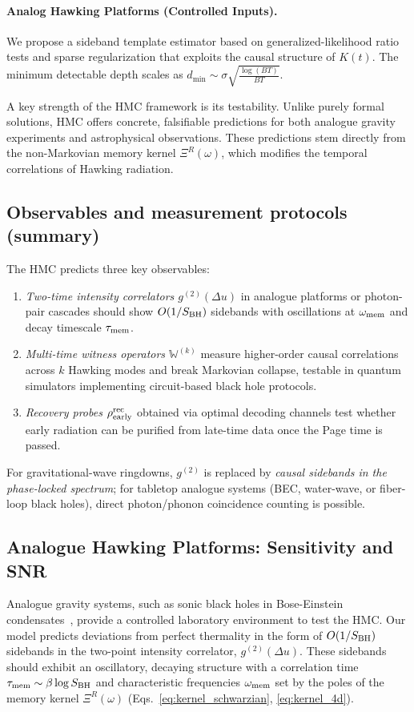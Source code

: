 \documentclass[a4paper,11pt]{article}
\newcommand{\HMC}{\textsc{HMC}\xspace}
\theoremstyle{plain}
\theoremstyle{definition}
\theoremstyle{remark}
\begin{document}
\paragraph{Analog Hawking Platforms (Controlled Inputs).}
We propose a sideband template estimator based on generalized-likelihood ratio tests and sparse regularization that exploits the causal structure of $K(t)$. The minimum detectable depth scales as $d_{\min}\sim \sigma \sqrt{\frac{\log(BT)}{BT}}$. 



A key strength of the \HMC{} framework is its testability. Unlike purely formal solutions, \HMC{} offers concrete, falsifiable predictions for both analogue gravity experiments and astrophysical observations. These predictions stem directly from the non-Markovian memory kernel $\Xi^R(\omega)$, which modifies the temporal correlations of Hawking radiation.

\subsection{Observables and measurement protocols (summary)}
The \HMC{} predicts three key observables:
\begin{enumerate}[label=(\roman*)]
\item \emph{Two-time intensity correlators $g^{(2)}(\Delta u)$} in analogue platforms or photon-pair cascades should show $O(1/S_{\rm BH})$ sidebands with oscillations at $\omega_{\rm mem}$ and decay timescale $\tau_{\rm mem}$.
\item \emph{Multi-time witness operators $\mathbb{W}^{(k)}$} measure higher-order causal correlations across $k$ Hawking modes and break Markovian collapse, testable in quantum simulators implementing circuit-based black hole protocols.
\item \emph{Recovery probes $\rho^{\rm rec}_{\rm early}$} obtained via optimal decoding channels test whether early radiation can be purified from late-time data once the Page time is passed.
\end{enumerate}
For gravitational-wave ringdowns, $g^{(2)}$ is replaced by \emph{causal sidebands in the phase-locked spectrum}; for tabletop analogue systems (BEC, water-wave, or fiber-loop black holes), direct photon/phonon coincidence counting is possible.

\subsection{Analogue Hawking Platforms: Sensitivity and SNR}
Analogue gravity systems, such as sonic black holes in Bose-Einstein condensates~\cite{Barcelo:2011, Steinhauer:2016}, provide a controlled laboratory environment to test the \HMC{}. Our model predicts deviations from perfect thermality in the form of $O(1/S_{\rm BH})$ sidebands in the two-point intensity correlator, $g^{(2)}(\Delta u)$. These sidebands should exhibit an oscillatory, decaying structure with a correlation time $\tau_{\rm mem}\sim \beta \log S_{\rm BH}$ and characteristic frequencies $\omega_{\rm mem}$ set by the poles of the memory kernel $\Xi^R(\omega)$ (Eqs.~\ref{eq:kernel_schwarzian}, \ref{eq:kernel_4d}).
\end{document}
